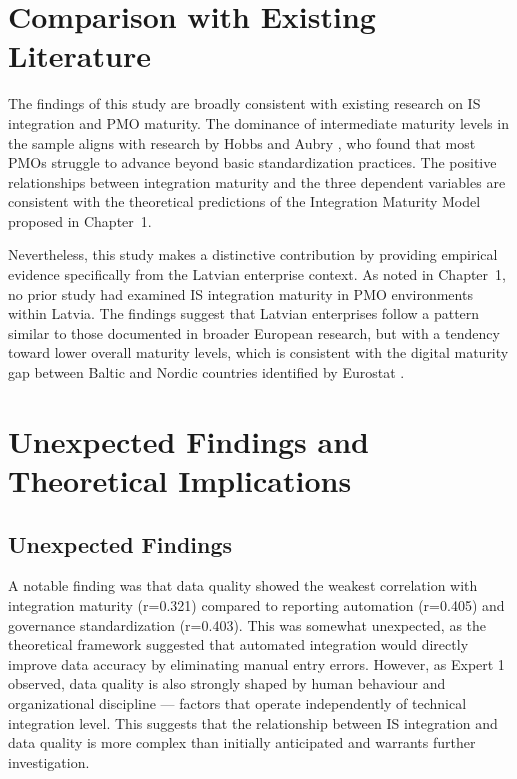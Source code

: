 \section{Comparison with Existing Literature}
\label{sec:literature-comparison}

The findings of this study are broadly consistent with existing research
on IS integration and PMO maturity. The dominance of intermediate maturity
levels in the sample aligns with research by Hobbs and Aubry
\cite{hobbs2007}, who found that most PMOs struggle to advance beyond
basic standardization practices. The positive relationships between
integration maturity and the three dependent variables are consistent
with the theoretical predictions of the Integration Maturity Model
proposed in Chapter~1.

Nevertheless, this study makes a distinctive contribution by providing
empirical evidence specifically from the Latvian enterprise context.
As noted in Chapter~1, no prior study had examined IS integration
maturity in PMO environments within Latvia. The findings suggest that
Latvian enterprises follow a pattern similar to those documented in
broader European research, but with a tendency toward lower overall
maturity levels, which is consistent with the digital maturity gap
between Baltic and Nordic countries identified by Eurostat
\cite{eurostat2023}.

\section{Unexpected Findings and Theoretical Implications}
\label{sec:implications}

\subsection{Unexpected Findings}
A notable finding was that data quality showed the weakest correlation
with integration maturity (r=0.321) compared to reporting automation
(r=0.405) and governance standardization (r=0.403). This was somewhat
unexpected, as the theoretical framework suggested that automated
integration would directly improve data accuracy by eliminating manual
entry errors. However, as Expert 1 observed, data quality is also
strongly shaped by human behaviour and organizational discipline ---
factors that operate independently of technical integration level.
This suggests that the relationship between IS integration and data
quality is more complex than initially anticipated and warrants
further investigation.

